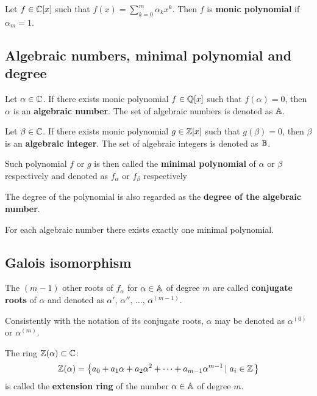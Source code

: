 \documentclass[text.tex]{subfiles}
\begin{document}
\begin{definition}
Let $f\in\mathbb{C}[x]$ such that $f(x) = \sum_{k=0}^m{\alpha_kx^k}$. Then $f$ is \textbf{monic polynomial} if $\alpha_m = 1$. 
\end{definition}

\subsection{Algebraic numbers, minimal polynomial and degree}
\begin{definition}\leavevmode

\noindent
Let $\alpha\in\mathbb{C}$. If there exists monic polynomial $f\in\mathbb{Q}[x]$ such that $f(\alpha) = 0$, then $\alpha$ is an \textbf{algebraic number}. The set of algebraic numbers is denoted as $\mathbb{A}$. 

\noindent
Let $\beta\in\mathbb{C}$. If there exists monic polynomial $g\in\mathbb{Z}[x]$ such that $g(\beta) = 0$, then $\beta$ is an \textbf{algebraic integer}.  The set of algebraic integers is denoted as $\mathbb{B}$. 

Such polynomial $f$ or $g$ is then called the \textbf{minimal polynomial} of $\alpha$ or $\beta$ respectively and denoted as $f_\alpha$ or $f_\beta$ respectively

The degree of the polynomial is also regarded as the \textbf{degree of the algebraic number}. 
\end{definition}

\begin{remark}
For each algebraic number there exists exactly one minimal polynomial. 
\end{remark}

\subsection{Galois isomorphism}

\begin{definition}
The $(m-1)$ other roots of $f_\alpha$ for $\alpha\in\mathbb{A}$ of degree $m$ are called \textbf{conjugate roots} of $\alpha$ and denoted as $\alpha',\,\alpha'',\,\dots,\,\alpha^{(m-1)}$. 
\end{definition}

\begin{remark}
Consistently with the notation of its conjugate roots, $\alpha$ may be denoted as $\alpha^{(0)}$ or $\alpha^{(m)}$.
\end{remark}

\begin{definition}
The ring $\mathbb{Z}(\alpha)\subset\mathbb{C}$: 
$$\mathbb{Z}(\alpha) = \left\{ a_0 + a_1\alpha + a_2\alpha^2 + \dots + a_{m-1}\alpha^{m-1} \left |\; a_i\in\mathbb{Z}\right. \right\}$$
is called the \textbf{extension ring} of the number $\alpha\in\mathbb{A}$ of degree $m$.
\end{definition}
\end{document}
